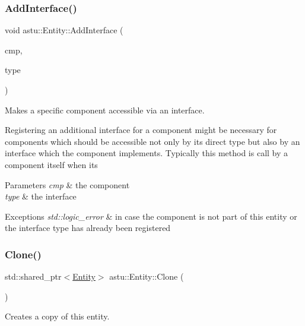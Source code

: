 \subsubsection{\texorpdfstring{Add\+Interface()}{AddInterface()}}
{\footnotesize\ttfamily void astu\+::\+Entity\+::\+Add\+Interface (\begin{DoxyParamCaption}\item[{\hyperlink{classastu_1_1EntityComponent}{Entity\+Component} \&}]{cmp,  }\item[{const std\+::type\+\_\+index \&}]{type }\end{DoxyParamCaption})}

Makes a specific component accessible via an interface.

Registering an additional interface for a component might be necessary for components which should be accessible not only by its direct type but also by an interface which the component implements. Typically this method is call by a component itself when its


\begin{DoxyParams}{Parameters}
{\em cmp} & the component \\
\hline
{\em type} & the interface \\
\hline
\end{DoxyParams}

\begin{DoxyExceptions}{Exceptions}
{\em std\+::logic\+\_\+error} & in case the component is not part of this entity or the interface type has already been registered \\
\hline
\end{DoxyExceptions}
\mbox{\label{classastu_1_1Entity_af7dc70da55f0110ffb340c839483debe}} 
\subsubsection{\texorpdfstring{Clone()}{Clone()}}
{\footnotesize\ttfamily std\+::shared\+\_\+ptr$<$\hyperlink{classastu_1_1Entity}{Entity}$>$ astu\+::\+Entity\+::\+Clone (\begin{DoxyParamCaption}{ }\end{DoxyParamCaption})\hspace{0.3cm}{\ttfamily [inline]}}

Creates a copy of this entity.


